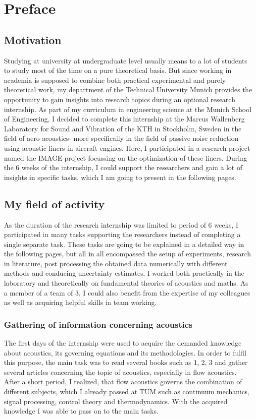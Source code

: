 \documentclass[11pt]{report} %
\begin{document}
\chapter{Preface}
\section{Motivation}
Studying at university at undergraduate level usually means to a lot of students to study most of the time on a pure theoretical basis.
But since working in academia is supposed to combine both practical experimental and purely theoretical work, my department of the Technical University Munich provides the opportunity to gain insights into research topics during an optional research internship.
As part of my curriculum in engineering science at the Munich School of Engineering, I decided to complete this internship at the Marcus Wallenberg Laboratory for Sound and Vibration of the KTH in Stockholm, Sweden in the field of aero acoustics-
more specifically in the field of passive noise reduction using acoustic liners in aircraft engines. Here, I participated in a research project named the IMAGE project focussing on the optimization of these liners. 
During the 6 weeks of the internship, I could support the researchers and gain a lot of insights in specific tasks, which I am going to present in the following pages. 

\section{My field of activity} 
As the duration of the research internship was limited to period of 6 weeks, I participated in many tasks supporting the researchers instead of completing a single separate task.
These tasks are going to be explained in a detailed way in the following pages, but all in all encompassed the setup of experiments, research in literature, post processing the obtained data numerically with different methods and conducing uncertainty estimates.
I worked both practically in the laboratory and theoretically on fundamental theories of acoustics and maths.
As a member of a team of 3, I could also benefit from the expertise of my colleagues as well as acquiring helpful skills in team working. 

\subsection{Gathering of information concerning acoustics } 
The first days of the internship were used to acquire the demanded knowledge about acoustics, its governing equations and its methodologies.
In order to fulfil this purpose, the main task was to read several books such as 1, 2, 3 and gather several articles concerning the topic of acoustics, especially in flow acoustics. 
After a short period, I realized, that flow acoustics governs the combination of different subjects, which I already passed at TUM such as continuum mechanics, signal processing, control theory and thermodynamics.
With the acquired knowledge I was able to pass on to the main tasks. 
\end{document}
